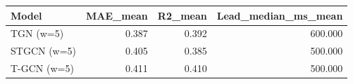 \begin{tabular}{lrrr}
\toprule
Model & MAE\_mean & R2\_mean & Lead\_median\_ms\_mean \\
\midrule
TGN (w=5) & 0.387 & 0.392 & 600.000 \\
STGCN (w=5) & 0.405 & 0.385 & 500.000 \\
T-GCN (w=5) & 0.411 & 0.410 & 500.000 \\
\bottomrule
\end{tabular}